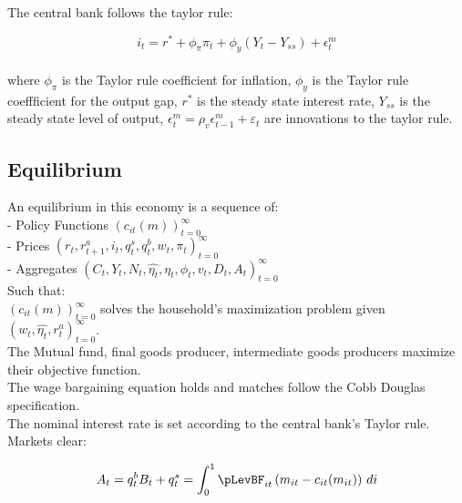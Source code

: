 \documentclass[titlepage]{\econtex}\providecommand{\texname}{Dissertation-Proposal}
\begin{document}
The central bank follows the taylor rule: 

$$i_{t} = r^{*} +\phi_{\pi} \pi_{t} + \phi_{y} (Y_{t} - Y_{ss}) + \epsilon^{m}_{t}$$ \\

where $\phi_{\pi}$ is the Taylor rule coefficient for inflation, $\phi_{y}$ is the Taylor rule coeffficient for the output gap,  $r^{*}$ is the steady state interest rate, $Y_{ss}$ is the steady state level of output,  $\epsilon^{m}_{t} = \rho_{v} \epsilon^{m}_{t-1} +\varepsilon_{t}$ are innovations to the taylor rule. \\

\hypertarget{Equilibrium}{}
\subsection{Equilibrium}


An equilibrium in this economy is a sequence of: \\

- Policy Functions $\left( c_{it}(m) \right )_{t=0}^{\infty}$ \\

- Prices $ \left(r_{t},  r^{a}_{t+1}, i_{t}, q^{s}_{t}, q^{b}_{t}, w_{t} , \pi_{t} \right) _{t=0}^{\infty}$\\

- Aggregates $ \left(C_{t}, Y_{t} , N_{t}, \hat{\eta_{t}},\eta_{t}, \phi_{t}, v_{t},  D_{t} , A_{t}  \right)_{t=0}^{\infty}$\\

Such that: \\

$ \left(  c_{it}(m)\right)_{t=0}^{\infty}$  solves the household's maximization problem given $  \left( w_{t}, \hat{\eta_{t}},  r^{a}_{t} \right)_{t=0}^{\infty}$.\\

The Mutual fund, final goods producer, intermediate goods producers maximize their objective function. \\

The wage bargaining equation holds and matches follow the Cobb Douglas specification.\\

The nominal interest rate is set according to the central bank's Taylor rule. \\


Markets clear:

 $$ A_t = q^{b}_{t} B_{t} + q^{s}_{t} =  \int_{0}^{1} \pLevBF_{it}\left( m_{it} - c_{it}(m_{it})\right) \, di $$\\
 
\end{document}
